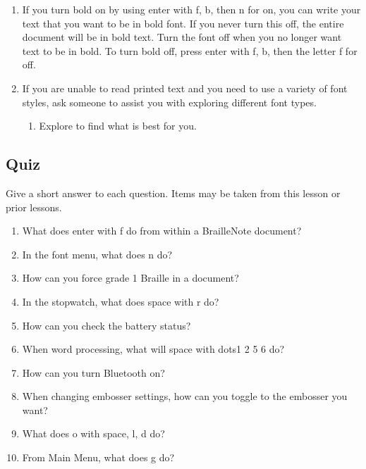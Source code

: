 \documentclass[10pt,letterpaper,twoside]{report}
\begin{document}
{{{\begin{enumerate}
\begin{enumerate}
		      \item font w
		      \item proportional spacing
		      \item 24 point character height
		      \item landscape
	      \end{enumerate}
	\item If you turn bold on by using enter with f, b, then n for on, you can write your text that you want to be in bold font.  If you never turn this off, the entire document will be in bold text.  Turn the font off when you no longer want text to be in bold.  To turn bold off, press enter with f, b, then the letter f for off.
	\item If you are unable to read printed text and you need to use a variety of font styles, ask someone to assist you with exploring different font types.
	      \begin{enumerate}
		      \item Explore to find what is best for you.
	      \end{enumerate}
\end{enumerate}
\clearpage
\subsection{Quiz}



Give a short answer to each question. Items may be taken from this lesson or prior lessons.



\begin{enumerate}
	\item What does enter with f do from within a BrailleNote document?
	\item In the font menu, what does n do?
	\item How can you force grade 1 Braille in a document?
	\item In the stopwatch, what does space with r do?
	\item How can you check the battery status?
	\item When word processing, what will space with dots1 2 5 6 do?
	\item How can you turn Bluetooth on?
	\item When changing embosser settings, how can you toggle to the embosser you want?
	\item What does o with space, l, d do?
	\item From Main Menu, what does g do?
\end{enumerate}

}}}
\end{document}
